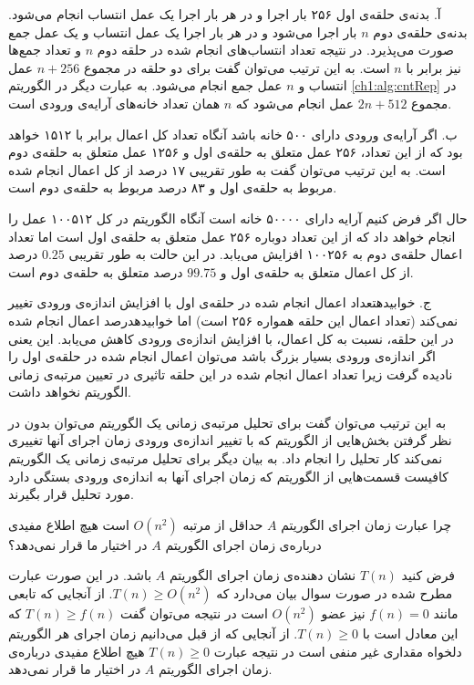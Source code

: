 
آ. بدنه‌ی حلقه‌‌ی اول ۲۵۶ بار اجرا و در هر بار اجرا یک عمل انتساب انجام می‌شود. بدنه‌ی حلقه‌ی دوم {$n$} بار اجرا می‌شود و در هر بار اجرا یک عمل انتساب و یک عمل جمع صورت می‌پذیرد. در نتیجه تعداد انتساب‌‌های انجام ‌شده در حلقه دوم {$n$} و تعداد جمع‌ها نیز برابر با {$n$} است. به این ترتیب می‌توان گفت برای دو حلقه در مجموع {$n+256$} عمل انتساب و {$n$} عمل جمع انجام می‌شود. به عبارت دیگر در الگوریتم {\eqref{ch1:alg:cntRep}} در مجموع {$2n+512$} عمل انجام می‌شود که {$n$} همان تعداد خانه‌های آرایه‌ی ورودی است.

ب. اگر آرایه‌ی ورودی دارای ۵۰۰ خانه باشد آنگاه تعداد کل اعمال برابر با ۱۵۱۲ خواهد بود که از این تعداد، ۲۵۶ عمل متعلق به حلقه‌ی اول و ۱۲۵۶ عمل متعلق به حلقه‌ی دوم است. به این ترتیب می‌توان گفت به طور تقریبی ۱۷ درصد از کل اعمال انجام ‌شده مربوط به حلقه‌ی اول و ۸۳ درصد مربوط به حلقه‌ی دوم است.

حال اگر فرض کنیم آرایه دارای ۵۰۰۰۰ خانه است آنگاه الگوریتم در کل ۱۰۰۵۱۲ عمل را انجام خواهد داد که از این تعداد دوباره ۲۵۶ عمل متعلق به حلقه‌ی اول است اما تعداد اعمال حلقه‌ی دوم به ۱۰۰۲۵۶ افزایش می‌یابد. در این حالت به طور تقریبی {$0.25$} درصد از کل اعمال متعلق به حلقه‌ی اول و {$99.75$} درصد متعلق به حلقه‌ی دوم است.
 
ج. ‌خوابیده{تعداد} اعمال انجام ‌شده در حلقه‌ی اول با افزایش اندازه‌ی ورودی تغییر نمی‌کند (تعداد اعمال این حلقه همواره ۲۵۶ است) اما ‌خوابیده{درصد} اعمال انجام شده در این حلقه، نسبت به کل اعمال، با افزایش اندازه‌ی ورودی کاهش می‌یابد. این یعنی اگر اندازه‌ی ورودی بسیار بزرگ باشد می‌توان اعمال انجام شده در حلقه‌ی اول را نادیده گرفت زیرا تعداد اعمال انجام شده در این حلقه تاثیری در تعیین مرتبه‌ی زمانی الگوریتم نخواهد داشت.

به این ترتیب می‌توان گفت برای تحلیل مرتبه‌ی زمانی یک الگوریتم می‌توان بدون در نظر گرفتن بخش‌هایی از الگوریتم که با تغییر اندازه‌ی ورودی زمان اجرای آنها تغییری نمی‌کند کار تحلیل را انجام داد. به بیان دیگر برای تحلیل مرتبه‌ی زمانی یک الگوریتم کافیست قسمت‌هایی از الگوریتم که زمان اجرای آنها به اندازه‌ی ورودی بستگی دارد مورد تحلیل قرار بگیرند.

 چرا عبارت {\prq}زمان اجرای الگوریتم {$A$} حداقل از مرتبه {$O(n^2)$} است{\plq} هیچ اطلاع مفیدی درباره‌ی زمان اجرای الگوریتم {$A$} در اختیار ما قرار نمی‌دهد؟


فرض کنید {$T(n)$} نشان دهنده‌ی زمان اجرای الگوریتم {$A$} باشد. در این صورت عبارت مطرح شده در صورت سوال بیان می‌دارد که {$T(n) \geq O(n^2)$}. از آنجایی که تابعی مانند {$f(n)=0$} نیز عضو {$O(n^2)$} است در نتیجه می‌توان گفت {$T(n)\geq f(n)$} که این معادل است با {$T(n) \geq 0$}. از آنجایی که از قبل می‌دانیم زمان اجرای هر الگوریتم دلخواه مقداری غیر منفی است در نتیجه عبارت {$T(n) \geq 0$} هیچ اطلاع مفیدی درباره‌ی زمان اجرای الگوریتم {$A$} در اختیار ما قرار نمی‌دهد.


